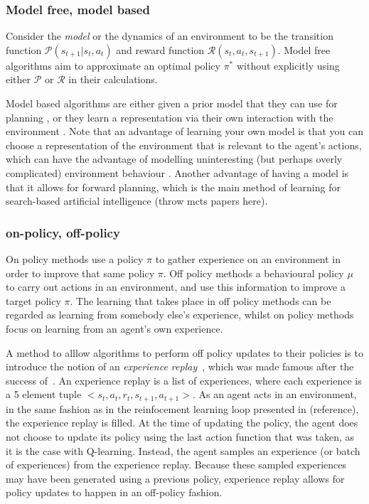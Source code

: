 \documentclass{../main.tex}{subfiles}
\begin{document}
\subsubsection{Model free, model based}
Consider the \textit{model} or the dynamics of an environment to be the transition function $\mathcal{P}(s_{t+1} | s_t, a_t)$ and reward function $\mathcal{R}(s_t, a_t, s_{t+1})$. Model free algorithms aim to approximate an optimal policy $\pi^*$ without explicitly using either $\mathcal{P}$ or $\mathcal{R}$ in their calculations.

Model based algorithms are either given a prior model that they can use for planning \citep{browne2012survey, Soemers2014}, or they learn a representation via their own interaction with the environment \citep{Sutton1991, Guzdial2017, Deisenroth2011}. Note that an advantage of learning your own model is that you can choose a representation of the environment that is relevant to the agent's actions, which can have the advantage of modelling uninteresting (but perhaps overly complicated) environment behaviour \citep{Pathak2017}. Another advantage of having a model is that it allows for forward planning, which is the main method of learning for search-based artificial intelligence (throw mcts papers here).


\subsubsection{on-policy, off-policy}
On policy methods use a policy $\pi$ to gather experience on an environment in order to improve that same policy $\pi$. Off policy methods a behavioural policy $\mu$ to carry out actions in an environment, and use this information to improve a target policy $\pi$. The learning that takes place in off policy methods can be regarded as learning from somebody else's experience, whilst on policy methods focus on learning from an agent's own experience.

A method to alllow algorithms to perform off policy updates to their policies is to introduce the notion of an \textit{experience replay}~\citep{Lin1993}, which was made famous after the success of~\cite{Mnih2013}. An experience replay is a list of experiences, where each experience is a 5 element tuple $<s_t, a_t, r_t, s_{t+1}, a_{t+1}>$. As an agent acts in an environment, in the same fashion as in the reinfocement learning loop presented in (reference), the experience replay is filled. At the time of updating the policy, the agent does not choose to update its policy using the last action function that was taken, as it is the case with Q-learning. Instead, the agent samples an experience (or batch of experiences) from the experience replay. Because these sampled experiences may have been generated using a previous policy, experience replay allows for policy updates to happen in an off-policy fashion.
\end{document}
